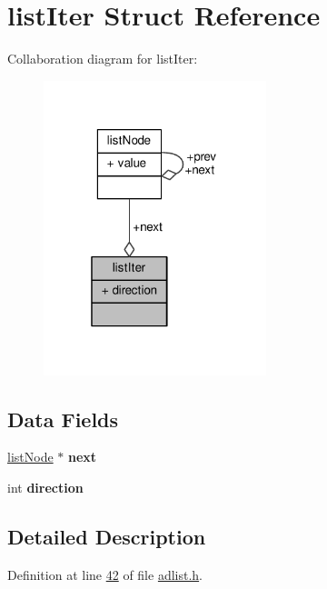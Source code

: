 \hypertarget{structlistIter}{}\section{list\+Iter Struct Reference}
\label{structlistIter}


Collaboration diagram for list\+Iter\+:\nopagebreak
\begin{figure}[H]
\begin{center}
\leavevmode
\includegraphics[width=184pt]{structlistIter__coll__graph}
\end{center}
\end{figure}
\subsection*{Data Fields}
\begin{DoxyCompactItemize}
\item 
\mbox{\label{structlistIter_aa5f95e2ea41a4b6408aff3677c491868}} 
\hyperlink{structlistNode}{list\+Node} $\ast$ {\bfseries next}
\item 
\mbox{\label{structlistIter_a3068efdb3a98e9b2b0bebc33e0815322}} 
int {\bfseries direction}
\end{DoxyCompactItemize}


\subsection{Detailed Description}


Definition at line \hyperlink{adlist_8h_source_l00042}{42} of file \hyperlink{adlist_8h_source}{adlist.\+h}.




